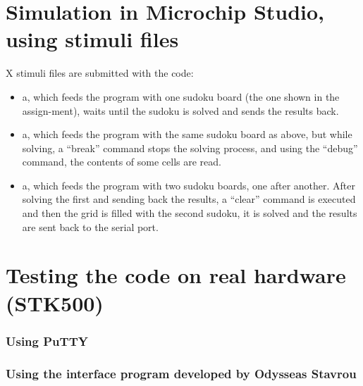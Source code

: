 \documentclass[12pt, a4]{article}
\begin{document}
\section*{Simulation in Microchip Studio, using stimuli files}
X stimuli files are submitted with the code:
\begin{itemize}
\item	a, which feeds the program with one sudoku board (the one shown in the assign-ment), waits until the sudoku is solved and sends the results back.
\item	a, which feeds the program with the same sudoku board as above, but while solving, a “break” command stops the solving process, and using the “debug” command, the contents of some cells are read.
\item	a, which feeds the program with two sudoku boards, one after another. After solving the first and sending back the results, a “clear” command is executed and then the grid is filled with the second sudoku, it is solved and the results are sent back to the serial port.
\end{itemize}

\section*{Testing the code on real hardware (STK500)}
\subsubsection*{Using PuTTY}
\subsubsection*{Using the interface program developed by Odysseas Stavrou}
\end{document}
